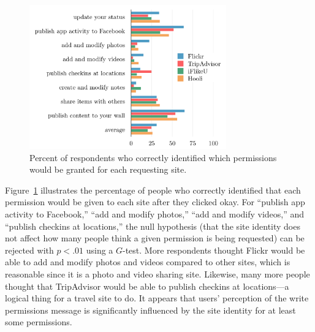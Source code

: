 \documentclass[twoside,letterpaper]{soups-poster}
\begin{document}
\begin{figure}[t!]
  \centering
  \includegraphics[width=8.5cm]{multi_percents_cosn}
  \caption{Percent of respondents who correctly identified which permissions would be granted for each requesting site.}
  \label{figure:multipercents}
\end{figure}

Figure~\ref{figure:multipercents} illustrates the percentage of people who correctly identified that each permission would be given to each site after they clicked okay.
For ``publish app activity to Facebook,'' ``add and modify photos,'' ``add and modify videos,'' and ``publish checkins at locations,'' the null hypothesis (that the site identity does not affect how many people think a given permission is being requested) can be rejected with $p < .01$ using a $G$-test. More respondents thought Flickr would be able to add and modify photos and videos compared to other sites, which is reasonable since it is a photo and video sharing site. Likewise, many more people thought that TripAdvisor would be able to publish checkins at locations---a logical thing for a travel site to do.
It appears that users' perception of the write permissions message is significantly influenced by the site identity for at least some permissions.


  
\end{document}
